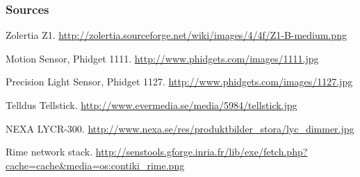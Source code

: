 \documentclass{beamer}
\begin{document}
\begin{frame}
\frametitle{Sources}

\begin{thebibliography}{10} 

Zolertia Z1.
\newblock \url{http://zolertia.sourceforge.net/wiki/images/4/4f/Z1-B-medium.png}

Motion Sensor, Phidget 1111.
\newblock \url{http://www.phidgets.com/images/1111.jpg}

Precision Light Sensor, Phidget 1127.
\newblock \url{http://www.phidgets.com/images/1127.jpg}

Telldus Tellstick.
\newblock \url{http://www.evermedia.se/media/5984/tellstick.jpg}

NEXA LYCR-300.
\newblock \url{http://www.nexa.se/res/produktbilder_stora/lyc_dimmer.jpg}

Rime network stack.
\newblock \url{http://senstools.gforge.inria.fr/lib/exe/fetch.php?cache=cache&media=os:contiki_rime.png}

\end{thebibliography}

\end{frame}
\end{document}
